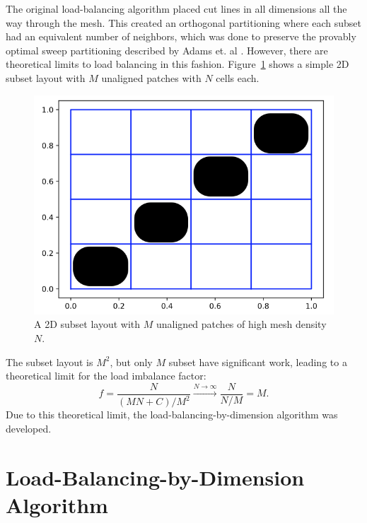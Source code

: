 The original load-balancing algorithm placed cut lines in all dimensions all the way through the mesh.
This created an orthogonal partitioning where each subset had an equivalent number of neighbors, which was done to preserve the provably optimal sweep partitioning described by Adams et. al \cite{mpadams2013,mpadams2015,mpadamsjcp}.
However, there are theoretical limits to load balancing in this fashion. Figure~\ref{2dgeneral} shows a simple 2D subset layout with $M$ unaligned patches with $N$ cells each.

\begin{figure}[H]
\centering
\includegraphics[scale=0.4]{../figures/theoretical_plot.png}
 \caption{A 2D subset layout with $M$ unaligned patches of high mesh density $N$.}
\label{2dgeneral}
\end{figure}
The subset layout is $M^2$, but only $M$ subset have significant work, leading to a theoretical limit for the load imbalance factor:
\begin{equation}
f= \frac{N}{(MN+C)/M^2} \xrightarrow{N\to \infty} \frac{N}{N/M} = M.
\end{equation}
Due to this theoretical limit, the load-balancing-by-dimension algorithm was developed.

\section{Load-Balancing-by-Dimension Algorithm}
\label{sec:lbd}

